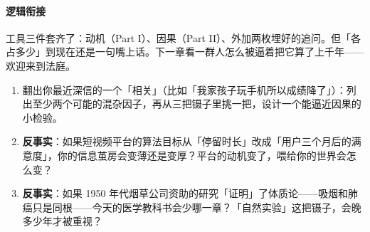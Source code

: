 \documentclass[../../main2.tex]{subfiles}
\begin{document}
\paragraph*{逻辑衔接}
	工具三件套齐了：动机（Part I）、因果（Part II）、外加两枚埋好的追问。但「各占多少」到现在还是一句嘴上话。下一章看一群人怎么被逼着把它算了上千年——欢迎来到法庭。

\begin{thinkbox}
\begin{enumerate}
	\item 翻出你最近深信的一个「相关」（比如「我家孩子玩手机所以成绩降了」）：列出至少两个可能的混杂因子，再从三把镊子里挑一把，设计一个能逼近因果的小检验。
	\item \textbf{反事实}：如果短视频平台的算法目标从「停留时长」改成「用户三个月后的满意度」，你的信息茧房会变薄还是变厚？平台的动机变了，喂给你的世界会怎么变？
	\item \textbf{反事实}：如果 1950 年代烟草公司资助的研究「证明」了体质论——吸烟和肺癌只是同根——今天的医学教科书会少哪一章？「自然实验」这把镊子，会晚多少年才被重视？
\end{enumerate}
\end{thinkbox}
\end{document}
